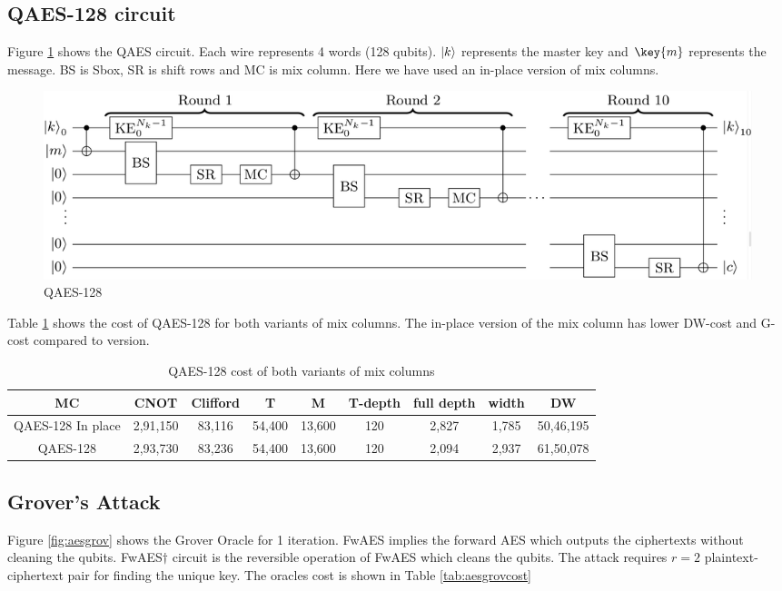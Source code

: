 \documentclass[preprint]{transcrypto}
\begin{document}
\subsection{QAES-128 circuit}
Figure \ref{fig:aesfull} shows the QAES circuit. Each wire represents 4 words (128 qubits). $\ket{k}$ represents the master key and $\key{m}$ represents the message. BS is Sbox, SR is shift rows and MC is mix column. Here we have used an in-place version of mix columns.

\begin{figure}[h!]
    \centering
    \includegraphics[width=\linewidth]{aes/aesfull.png}
    \caption{QAES-128 \cite{aeslowmc}}
    \label{fig:aesfull}
\end{figure}

Table \ref{tab:aescost} shows the cost of QAES-128 for both variants of mix columns. The in-place version of the mix column has lower DW-cost and G-cost compared to \cite{aesmc} version. 


\begin{center}
\begin{table}[h!]
    \centering
    \begin{tabular}{ |c|c|c|c|c|c|c|c|c| } 
     \hline
     MC & CNOT & Clifford & T & M & T-depth & full depth & width & DW \\ \hline
    QAES-128 In place  & 2,91,150& 83,116&54,400&13,600&120&2,827&1,785&50,46,195 \\ \hline
     QAES-128 \cite{aesmc} &2,93,730&83,236&54,400&13,600&120&2,094&2,937&61,50,078   \\ \hline
    \end{tabular}
    \caption{QAES-128 cost of both variants of mix columns}
    \label{tab:aescost}
\end{table}
\end{center}

\subsection{Grover's Attack}
Figure \ref{fig:aesgrov} shows the Grover Oracle for 1 iteration. FwAES implies the forward AES which outputs the ciphertexts without cleaning the qubits. FwAES$\dagger$ circuit is the reversible operation of FwAES which cleans the qubits. The attack requires $r = 2$ plaintext-ciphertext pair for finding the unique key. The oracles cost is shown in Table \ref{tab:aesgrovcost}
\end{document}
